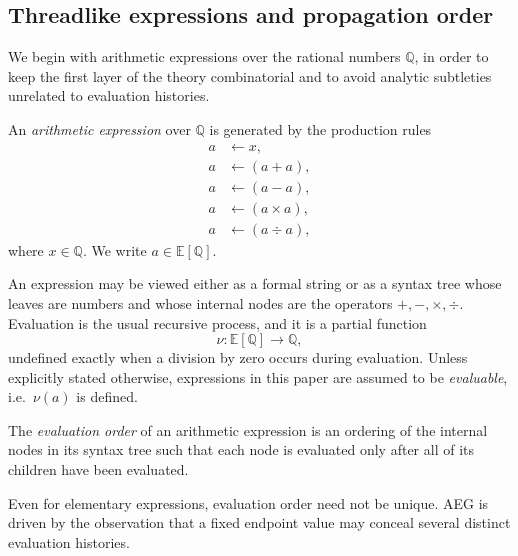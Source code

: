 
\subsection{Threadlike expressions and propagation order}\label{subsec:flow-threadlike}

We begin with arithmetic expressions over the rational numbers $\mathbb{Q}$, in order to keep the first layer of the theory combinatorial and to avoid analytic subtleties unrelated to evaluation histories.

\begin{definition}\label{def:flow-arithmetic-expression}
An \emph{arithmetic expression} over $\mathbb{Q}$ is generated by the production rules
\begin{equation}\label{eq:flow-productionrule}
\begin{aligned}
a &\longleftarrow x, \\
a &\longleftarrow (a+a), \\
a &\longleftarrow (a-a), \\
a &\longleftarrow (a\times a), \\
a &\longleftarrow (a\div a),
\end{aligned}
\end{equation}
where $x\in\mathbb{Q}$. We write $a\in \mathbb{E}[\mathbb{Q}]$.
\end{definition}

An expression may be viewed either as a formal string or as a syntax tree whose leaves are numbers and whose internal nodes are the operators $+,-,\times,\div$. Evaluation is the usual recursive process, and it is a partial function
\[
\nu:\mathbb{E}[\mathbb{Q}]\to \mathbb{Q},
\]
undefined exactly when a division by zero occurs during evaluation. Unless explicitly stated otherwise, expressions in this paper are assumed to be \emph{evaluable}, i.e.\ $\nu(a)$ is defined.

\begin{definition}\label{def:flow-evaluation-order}
The \emph{evaluation order} of an arithmetic expression is an ordering of the internal nodes in its syntax tree such that each node is evaluated only after all of its children have been evaluated.
\end{definition}

Even for elementary expressions, evaluation order need not be unique. AEG is driven by the observation that a fixed endpoint value may conceal several distinct evaluation histories.

